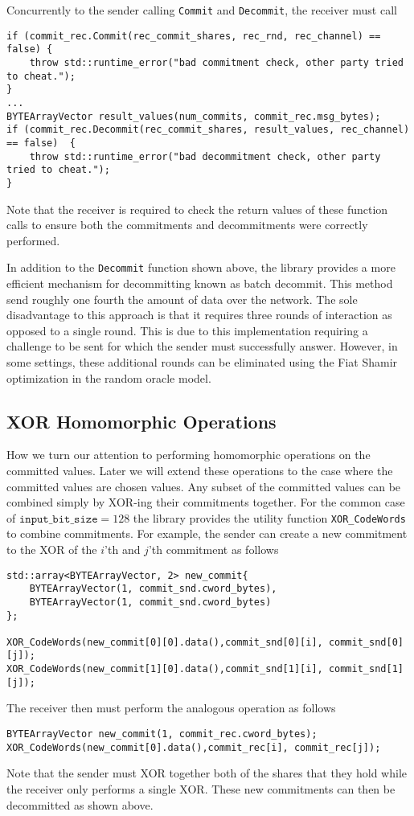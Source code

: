 Concurrently to the sender calling \texttt{Commit} and \texttt{Decommit}, the receiver must call 
\begin{lstlisting}     
if (commit_rec.Commit(rec_commit_shares, rec_rnd, rec_channel) == false) {
	throw std::runtime_error("bad commitment check, other party tried to cheat.");
}
...
BYTEArrayVector result_values(num_commits, commit_rec.msg_bytes);
if (commit_rec.Decommit(rec_commit_shares, result_values, rec_channel) == false)  {
	throw std::runtime_error("bad decommitment check, other party tried to cheat.");
}
\end{lstlisting}
Note that the receiver is required to check the return values of these function calls to ensure both the commitments and decommitments were correctly performed.

In addition to the \texttt{Decommit} function shown above, the library provides a more efficient mechanism for decommitting known as batch decommit. This method send roughly one fourth the amount of data over the network. The sole disadvantage to this approach is that it requires three rounds of interaction as opposed to a single round. This is due to this implementation requiring a challenge to be sent for which the sender must successfully answer. However, in some settings, these additional rounds can be eliminated using the Fiat Shamir optimization in the random oracle model\cite{XXX}.

\subsection{XOR Homomorphic Operations}


How we turn our attention to performing homomorphic operations on the committed values. Later we will extend these operations to the case where the committed values are chosen values. Any subset of the committed values can be combined simply by XOR-ing their commitments together. For the common case of $\texttt{input\_bit\_size} =128$ the library provides the utility function \texttt{XOR\_CodeWords} to combine commitments. For example, the sender can create a new commitment to the XOR of the $i$'th and $j$'th  commitment as follows
\begin{lstlisting}     
std::array<BYTEArrayVector, 2> new_commit{
	BYTEArrayVector(1, commit_snd.cword_bytes),
	BYTEArrayVector(1, commit_snd.cword_bytes)
};

XOR_CodeWords(new_commit[0][0].data(),commit_snd[0][i], commit_snd[0][j]);
XOR_CodeWords(new_commit[1][0].data(),commit_snd[1][i], commit_snd[1][j]);
\end{lstlisting}
The receiver then must perform the analogous operation as follows
\begin{lstlisting}     
BYTEArrayVector new_commit(1, commit_rec.cword_bytes);
XOR_CodeWords(new_commit[0].data(),commit_rec[i], commit_rec[j]);
\end{lstlisting}
Note that the sender must XOR together both of the shares that they hold while the receiver only performs a single XOR. These new commitments can then be decommitted as shown above.

